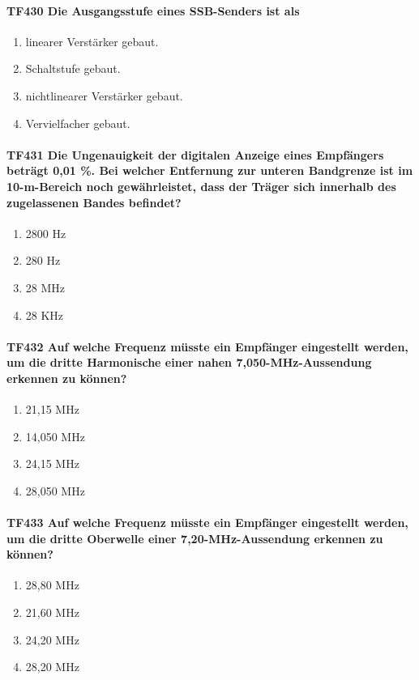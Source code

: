 \documentclass[8pt]{article}
\begin{document}
\paragraph*{TF430 Die Ausgangsstufe eines SSB-Senders ist als}
\begin{enumerate}[nolistsep,label=\Alph*]
\item linearer Verstärker gebaut.
\item Schaltstufe gebaut.
\item nichtlinearer Verstärker gebaut.
\item Vervielfacher gebaut.
\end{enumerate}

\paragraph*{TF431 Die Ungenauigkeit der digitalen Anzeige eines Empfängers beträgt 0,01 \%. Bei welcher Entfernung zur unteren Bandgrenze ist im 10-m-Bereich noch gewährleistet, dass der Träger sich innerhalb des zugelassenen Bandes befindet?}
\begin{enumerate}[nolistsep,label=\Alph*]
\item 2800 Hz
\item 280 Hz
\item 28 MHz
\item 28 KHz
\end{enumerate}

\paragraph*{TF432 Auf welche Frequenz müsste ein Empfänger eingestellt werden, um die dritte Harmonische einer nahen 7,050-MHz-Aussendung erkennen zu können?}
\begin{enumerate}[nolistsep,label=\Alph*]
\item 21,15 MHz
\item 14,050 MHz
\item 24,15 MHz
\item 28,050 MHz
\end{enumerate}

\paragraph*{TF433 Auf welche Frequenz müsste ein Empfänger eingestellt werden, um die dritte Oberwelle einer 7,20-MHz-Aussendung erkennen zu können?}
\begin{enumerate}[nolistsep,label=\Alph*]
\item 28,80 MHz
\item 21,60 MHz
\item 24,20 MHz
\item 28,20 MHz
\end{enumerate}
\end{document}
